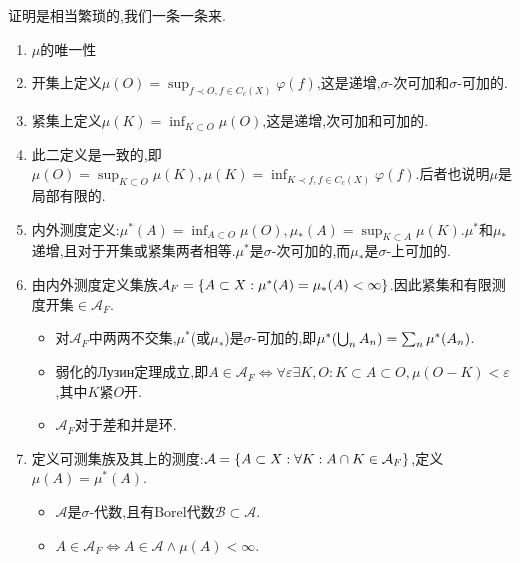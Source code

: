 \documentclass{article}
\begin{document}
证明是相当繁琐的,我们一条一条来.
\begin{enumerate}
    \item $\mu$的唯一性
    \item 开集上定义$\mu(O)=\sup_{f\prec O, f\in C_c(X)}\varphi(f)$,这是递增,$\sigma$-次可加和$\sigma$-可加的.
    \item 紧集上定义$\mu(K)=\inf_{K\subset O}\mu(O)$,这是递增,次可加和可加的.
    \item 此二定义是一致的,即$\mu(O)=\sup_{K\subset O}\mu(K), \mu(K)=\inf_{K\prec f, f\in C_c(X)}\varphi(f)$.后者也说明$\mu$是局部有限的.\\
    \item 内外测度定义:$\mu^*(A)=\inf_{A\subset O}\mu(O), \mu_*(A)=\sup_{K\subset A}\mu(K)$.$\mu^*$和$\mu_*$递增,且对于开集或紧集两者相等.$\mu^*$是$\sigma$-次可加的,而$\mu_*$是$\sigma$-上可加的.
    \item 由内外测度定义集族$\mathcal{A}_F=\left\{A\subset X:\mu^*(A)=\mu_*(A)<\infty\right\}$.因此紧集和有限测度开集$\in \mathcal{A}_F$.\begin{itemize}
        \item 对$\mathcal{A}_F$中两两不交集,$\mu^*$(或$\mu_*$)是$\sigma$-可加的,即$\mu^*\!\left(\bigcup_n A_n\right)=\sum_n\mu^*(A_n)$.
        \item 弱化的Лузин定理成立,即$A\in \mathcal{A}_F\iff \forall \varepsilon\exists K,O:K\subset A\subset O, \mu(O-K)<\varepsilon$,其中$K$紧$O$开.\\
        \item $\mathcal{A}_F$对于差和并是环.
    \end{itemize}
    \item 定义可测集族及其上的测度:$\mathcal{A}=\left\{A\subset X:\forall K:A\cap K\in \mathcal{A}_F\right\}$,定义$\mu(A)=\mu^*(A)$.\begin{itemize}
        \item $\mathcal{A}$是$\sigma$-代数,且有Borel代数$\mathcal{B}\subset \mathcal{A}$.
        \item $A\in \mathcal{A}_F\iff A\in\mathcal{A}\land \mu(A)<\infty$.
    \end{itemize}
\end{enumerate}
\end{document}
